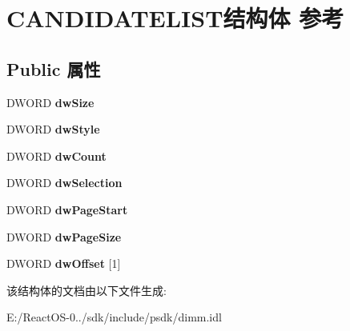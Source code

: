 \hypertarget{struct_c_a_n_d_i_d_a_t_e_l_i_s_t}{}\section{C\+A\+N\+D\+I\+D\+A\+T\+E\+L\+I\+S\+T结构体 参考}
\label{struct_c_a_n_d_i_d_a_t_e_l_i_s_t}
\subsection*{Public 属性}
\begin{DoxyCompactItemize}
\item 
\mbox{\label{struct_c_a_n_d_i_d_a_t_e_l_i_s_t_ab401fc53f508f41b9007433f3acf88e7}} 
D\+W\+O\+RD {\bfseries dw\+Size}
\item 
\mbox{\label{struct_c_a_n_d_i_d_a_t_e_l_i_s_t_a7200327e11eaefee57d8199495bfde63}} 
D\+W\+O\+RD {\bfseries dw\+Style}
\item 
\mbox{\label{struct_c_a_n_d_i_d_a_t_e_l_i_s_t_a6bfee1ed79012a19c60f775aeee258c6}} 
D\+W\+O\+RD {\bfseries dw\+Count}
\item 
\mbox{\label{struct_c_a_n_d_i_d_a_t_e_l_i_s_t_a171b38ac831150a6f89560eac150725c}} 
D\+W\+O\+RD {\bfseries dw\+Selection}
\item 
\mbox{\label{struct_c_a_n_d_i_d_a_t_e_l_i_s_t_a788a4d3f9a6fc863c5ec962a8b705a02}} 
D\+W\+O\+RD {\bfseries dw\+Page\+Start}
\item 
\mbox{\label{struct_c_a_n_d_i_d_a_t_e_l_i_s_t_a1d723d417e79237cfa02e777668ce07c}} 
D\+W\+O\+RD {\bfseries dw\+Page\+Size}
\item 
\mbox{\label{struct_c_a_n_d_i_d_a_t_e_l_i_s_t_ad6715972ca37ecda414c1674975531cf}} 
D\+W\+O\+RD {\bfseries dw\+Offset} \mbox{[}1\mbox{]}
\end{DoxyCompactItemize}


该结构体的文档由以下文件生成\+:\begin{DoxyCompactItemize}
\item 
E\+:/\+React\+O\+S-\/0../sdk/include/psdk/dimm.\+idl\end{DoxyCompactItemize}
